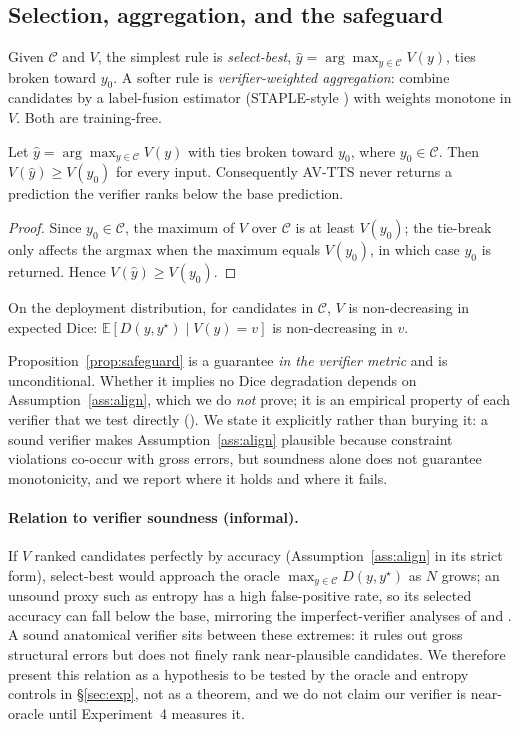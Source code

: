 \documentclass[10pt]{article}
\begin{document}
\subsection{Selection, aggregation, and the safeguard}
Given $\mathcal{C}$ and $V$, the simplest rule is \emph{select-best}, $\hat y=\arg\max_{y\in\mathcal{C}}V(y)$, ties broken toward $y_0$. A softer rule is \emph{verifier-weighted aggregation}: combine candidates by a label-fusion estimator (STAPLE-style \citep{warfield2004staple}) with weights monotone in $V$. Both are training-free.

\begin{proposition}\label{prop:safeguard}
Let $\hat y=\arg\max_{y\in\mathcal{C}}V(y)$ with ties broken toward $y_0$, where $y_0\in\mathcal{C}$. Then $V(\hat y)\ge V(y_0)$ for every input. Consequently AV-TTS never returns a prediction the verifier ranks below the base prediction.
\end{proposition}
\begin{proof}
Since $y_0\in\mathcal{C}$, the maximum of $V$ over $\mathcal{C}$ is at least $V(y_0)$; the tie-break only affects the argmax when the maximum equals $V(y_0)$, in which case $y_0$ is returned. Hence $V(\hat y)\ge V(y_0)$.
\end{proof}

\begin{assumption}\label{ass:align}
On the deployment distribution, for candidates in $\mathcal{C}$, $V$ is non-decreasing in expected Dice: $\mathbb{E}[D(y,y^\star)\mid V(y)=v]$ is non-decreasing in $v$.
\end{assumption}
Proposition~\ref{prop:safeguard} is a guarantee \emph{in the verifier metric} and is unconditional. Whether it implies no Dice degradation depends on Assumption~\ref{ass:align}, which we do \emph{not} prove; it is an empirical property of each verifier that we test directly (). We state it explicitly rather than burying it: a sound verifier makes Assumption~\ref{ass:align} plausible because constraint violations co-occur with gross errors, but soundness alone does not guarantee monotonicity, and we report where it holds and where it fails.

\paragraph{Relation to verifier soundness (informal).} If $V$ ranked candidates perfectly by accuracy (Assumption~\ref{ass:align} in its strict form), select-best would approach the oracle $\max_{y\in\mathcal C}D(y,y^\star)$ as $N$ grows; an unsound proxy such as entropy has a high false-positive rate, so its selected accuracy can fall below the base, mirroring the imperfect-verifier analyses of \citet{stroebl2024verifier} and \citet{setlur2025verifier}. A sound anatomical verifier sits between these extremes: it rules out gross structural errors but does not finely rank near-plausible candidates. We therefore present this relation as a hypothesis to be tested by the oracle and entropy controls in \S\ref{sec:exp}, not as a theorem, and we do not claim our verifier is near-oracle until Experiment~4 measures it.
\end{document}
